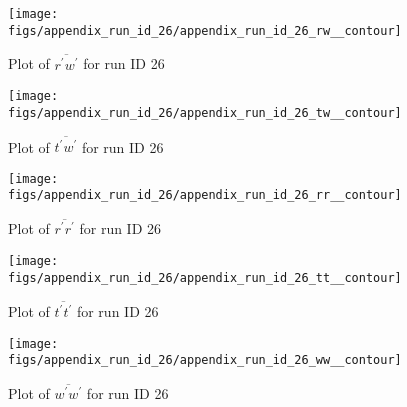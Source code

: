 \begin{figure}[H]
\centering
\texttt{[image: figs/appendix\_run\_id\_26/appendix\_run\_id\_26\_rw\_\_contour]}
\caption{Plot of $\overline{r^\prime w^\prime}$ for run ID 26}
\label{fig:appendix_run_id_26_rw__contour}
\end{figure}


\begin{figure}[H]
\centering
\texttt{[image: figs/appendix\_run\_id\_26/appendix\_run\_id\_26\_tw\_\_contour]}
\caption{Plot of $\overline{t^\prime w^\prime}$ for run ID 26}
\label{fig:appendix_run_id_26_tw__contour}
\end{figure}


\begin{figure}[H]
\centering
\texttt{[image: figs/appendix\_run\_id\_26/appendix\_run\_id\_26\_rr\_\_contour]}
\caption{Plot of $\overline{r^\prime r^\prime}$ for run ID 26}
\label{fig:appendix_run_id_26_rr__contour}
\end{figure}


\begin{figure}[H]
\centering
\texttt{[image: figs/appendix\_run\_id\_26/appendix\_run\_id\_26\_tt\_\_contour]}
\caption{Plot of $\overline{t^\prime t^\prime}$ for run ID 26}
\label{fig:appendix_run_id_26_tt__contour}
\end{figure}


\begin{figure}[H]
\centering
\texttt{[image: figs/appendix\_run\_id\_26/appendix\_run\_id\_26\_ww\_\_contour]}
\caption{Plot of $\overline{w^\prime w^\prime}$ for run ID 26}
\label{fig:appendix_run_id_26_ww__contour}
\end{figure}


